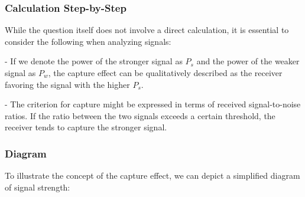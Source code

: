 \subsubsection{Calculation Step-by-Step}

While the question itself does not involve a direct calculation, it is essential to consider the following when analyzing signals:

- If we denote the power of the stronger signal as \( P_s \) and the power of the weaker signal as \( P_w \), the capture effect can be qualitatively described as the receiver favoring the signal with the higher \( P_s \).

- The criterion for capture might be expressed in terms of received signal-to-noise ratios. If the ratio between the two signals exceeds a certain threshold, the receiver tends to capture the stronger signal.

\subsubsection{Diagram}

To illustrate the concept of the capture effect, we can depict a simplified diagram of signal strength:

\begin{center}
\end{center}
